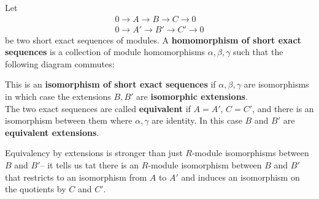 \documentclass{memoir}
\begin{document}
\begin{defn}
	Let
	\begin{align*}
		0 \to A \to B \to C \to 0\\
		0 \to A' \to B' \to C' \to 0
	\end{align*}
	be two short exact sequences of modules. A \textbf{homomorphism of short exact sequences} is a collection of module homomorphisms \(\alpha ,\beta ,\gamma \) such that the following diagram commutes:
\begin{center}
\end{center}
This is an \textbf{isomorphism of short exact sequences} if \(\alpha ,\beta ,\gamma \) are isomorphisms in which case the extensions \(B,B'\) are \textbf{isomorphic extensions}.\\

The two exact sequences are called \textbf{equivalent} if \(A = A'\), \(C = C'\), and there is an isomorphism between them where  \(\alpha ,\gamma \) are identity. In this case \(B\) and \(B'\) are \textbf{equivalent extensions}.
\end{defn}
Equivalency by extensions is stronger than just \(R\)-module isomorphisms between \(B\) and \(B'\)-- it tells us tat there is an \(R\)-module isomorphism between \(B\) and \(B'\) that restricts to an isomorphism from \(A\) to \(A'\) and induces an isomorphism on the quotients by \(C\) and \(C'\).

\begin{exmp}
	
\end{exmp}
\end{document}
